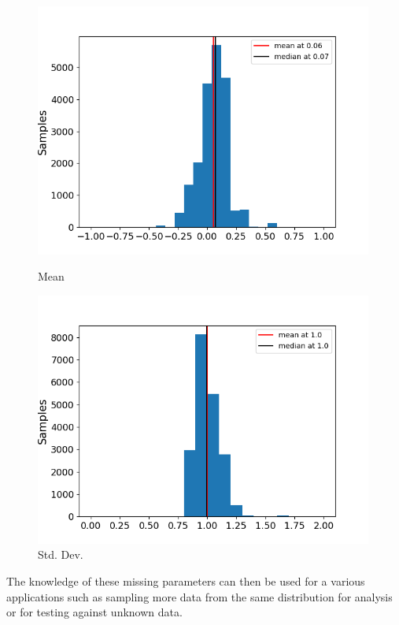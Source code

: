 \documentclass[a4paper,11pt]{article}
\theoremstyle{mytheor}
\begin{document}
    \begin{figure}[H]
    \centering
    \begin{minipage}{0.49\textwidth}
        \centering
        \includegraphics[width=0.99\textwidth]{data/meanc.png} %
        \caption{Mean}
        \label{fig:mean_missing_data}
    \end{minipage}
    \begin{minipage}{0.49\textwidth}
        \centering
        \includegraphics[width=0.99\textwidth]{data/stdevc.png} %
        \caption{Std. Dev.}
        \label{fig:std_missing_data}
    \end{minipage}
    
\end{figure}
    The knowledge of these missing parameters can then be used for a various applications such as sampling more data from the same distribution for analysis or for testing against unknown data. 
\end{document}
